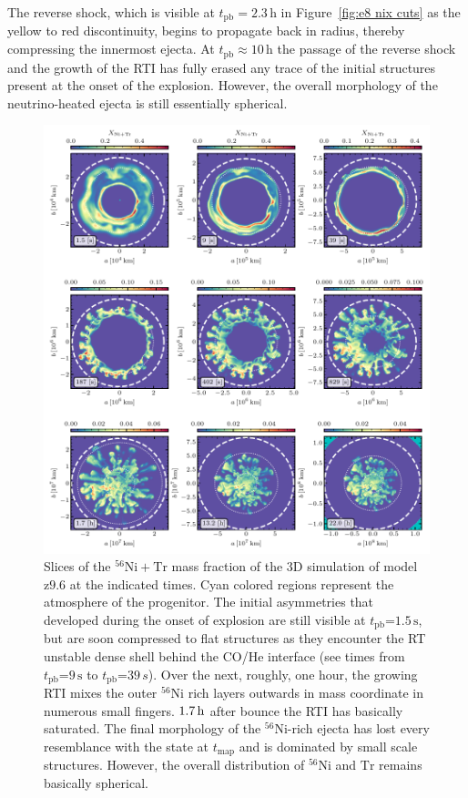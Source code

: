 \documentclass[fleqn,usenatbib]{mnras}
\newcommand{\tpb}{\ensuremath{t_{\text{pb}}}}
\newcommand{\nickel}{\ensuremath{\mathrm{^{56}Ni}}\xspace}
\newcommand{\tracer}{\ensuremath{\mathrm{Tr}}\xspace}
\newcommand{\s}{\ensuremath{\text{s}}}
\newcommand{\znine}{\ensuremath{\mathrm{z9.6}}\xspace}
\begin{document}
The reverse shock, which is visible at $\tpb=2.3\,\text{h}$ in 
Figure~\ref{fig:e8 nix cuts} as the yellow to red discontinuity, 
begins to propagate back in radius, thereby 
compressing the innermost ejecta.
At $\tpb\mathrm{\approx }10\,\text{h}$ the passage of the reverse shock and 
the growth of the RTI has fully erased any trace of the initial structures 
present at the onset of the explosion. 
However, the overall morphology of the neutrino-heated ejecta is still essentially spherical.

\begin{figure}%
 \centering
 \includegraphics[width=\textwidth,trim=0cm 0.0cm 0cm 0cm,clip]{pic/z9_3d_3x3_NiX.pdf}
 \caption{Slices of the $\nickel+\tracer$ mass fraction of the 3D simulation of model
        \znine at the indicated times.  Cyan colored regions represent the atmosphere of the progenitor. 
   The initial asymmetries that developed during the onset of explosion are still visible at $\tpb\mathord{=}1.5\,\s$,
   but are soon compressed to flat structures as they encounter the RT unstable dense shell behind the CO/He interface
   (see times from $\tpb\mathord{=}9\,\s$ to $\tpb\mathord{=}39\,s$). 
   Over the next, roughly, one hour, the growing RTI mixes the outer \nickel rich layers outwards in mass coordinate in numerous 
   small fingers.
   $1.7\,\rm h$ after bounce the RTI has basically saturated. The final morphology of the \nickel-rich ejecta has lost every
   resemblance with the state at $t_{\mathrm{map}}$ and is dominated by small scale structures. However, the overall 
   distribution of \nickel and \tracer remains basically spherical.
 }
 \label{fig:z9 nix cuts}
\end{figure}%
\end{document}
